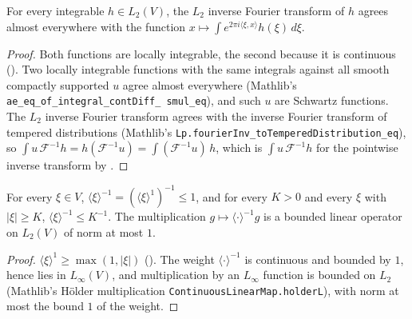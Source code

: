 \begin{theorem}
\label{thm:fourier-inverse-l1-l2}
\leanok
{}
For every integrable $h \in L_2(V)$, the $L_2$ inverse Fourier transform of $h$ agrees almost
everywhere with the function
$x \mapsto \int e^{2 \pi i \langle \xi, x \rangle} h(\xi) \, d\xi$.
\end{theorem}

\begin{proof}
\leanok
Both functions are locally integrable, the second because it is continuous
(). Two locally integrable functions with the same integrals
against all smooth compactly supported $u$ agree almost everywhere (Mathlib's
\texttt{ae\_\allowbreak eq\_\allowbreak of\_\allowbreak integral\_\allowbreak contDiff\_\allowbreak
smul\_\allowbreak eq}), and such $u$ are Schwartz functions. The $L_2$ inverse Fourier transform
agrees with the inverse Fourier transform of tempered distributions (Mathlib's
\texttt{Lp.\allowbreak fourierInv\_\allowbreak toTemperedDistribution\_\allowbreak eq}), so
$\int u \, \mathcal F^{-1} h = h(\mathcal F^{-1} u) = \int (\mathcal F^{-1} u) \, h$, which is
$\int u \, \mathcal F^{-1} h$ for the pointwise inverse transform by
.
\end{proof}

\begin{lemma}
\label{lem:bessel-weight-inverse}
\leanok
{}
For every $\xi \in V$, $\langle \xi \rangle^{-1} = (\langle \xi \rangle^1)^{-1} \leq 1$, and for
every $K > 0$ and every $\xi$ with $|\xi| \geq K$, $\langle \xi \rangle^{-1} \leq K^{-1}$. The
multiplication $g \mapsto \langle \cdot \rangle^{-1} g$ is a bounded linear operator on $L_2(V)$
of norm at most $1$.
\end{lemma}

\begin{proof}
\leanok
$\langle \xi \rangle^1 \geq \max(1, |\xi|)$ (). The weight
$\langle \cdot \rangle^{-1}$ is continuous and bounded by $1$, hence lies in $L_\infty(V)$, and
multiplication by an $L_\infty$ function is bounded on $L_2$ (Mathlib's Hölder multiplication
\texttt{ContinuousLinearMap.\allowbreak holderL}), with norm at most the bound $1$ of the weight.
\end{proof}

